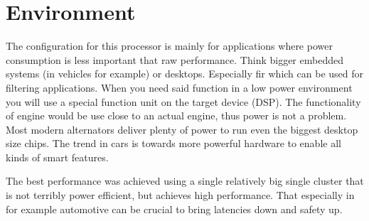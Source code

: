 \section{Environment}
The configuration for this processor is mainly for applications where power consumption is less important that raw performance.
Think bigger embedded systems (in vehicles for example) or desktops.
Especially fir which can be used for filtering applications.
When you need said function in a low power environment you will use a special function unit on the target device (DSP).
The functionality of engine would be use close to an actual engine, thus power is not a problem.
Most modern alternators deliver plenty of power to run even the biggest desktop size chips.
The trend in cars is towards more powerful hardware to enable all kinds of smart features.

The best performance was achieved using a single relatively big single cluster that is not terribly power efficient, but achieves high performance.
That especially in for example automotive can be crucial to bring latencies down and safety up.

